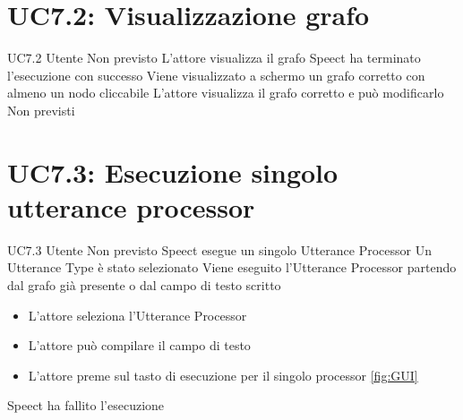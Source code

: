 \documentclass[../AnalisideiRequisiti.tex]{subfiles}
\begin{document}
\section{UC7.2: Visualizzazione grafo}
\UserCase
{UC7.2}
{Utente}
{Non previsto}
{L'attore visualizza il grafo}
{Speect ha terminato l'esecuzione con successo }
{Viene visualizzato a schermo un grafo corretto con almeno un nodo cliccabile}
{
	L'attore visualizza il grafo corretto e può modificarlo 
}
{Non previsti}

\section{UC7.3: Esecuzione singolo utterance processor}
\UserCase
{UC7.3}
{Utente}
{Non previsto}
{Speect esegue un singolo Utterance Processor}
{Un Utterance Type è stato selezionato  }
{Viene eseguito l'Utterance Processor partendo dal grafo già presente o dal campo di testo scritto}
{
	\begin{itemize}
		\item{} L'attore seleziona l'Utterance Processor 
		\item{} L'attore può compilare il campo di testo
		\item{} L'attore preme sul tasto di esecuzione per il singolo processor \ref{fig:GUI}
	\end{itemize}
}
{Speect ha fallito l'esecuzione}
\end{document}
